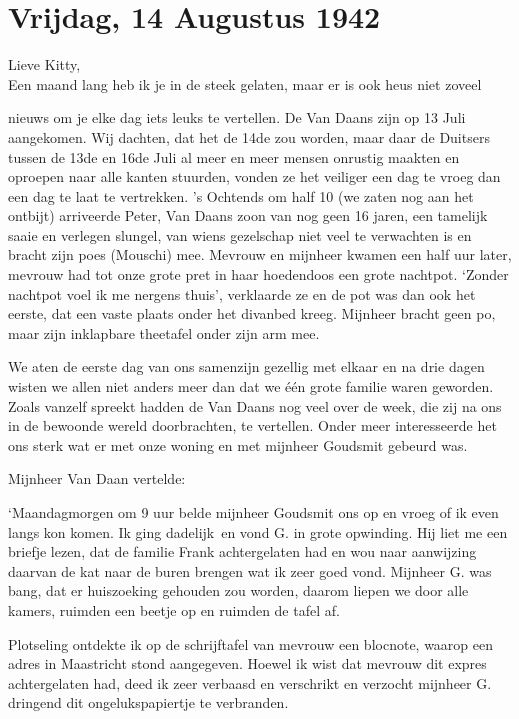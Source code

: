 \documentclass{book}
\begin{document}
\chapter{Vrijdag, 14 Augustus 1942}

Lieve Kitty,\\Een maand lang heb ik je in de steek gelaten, maar er is
ook heus niet zoveel

nieuws om je elke dag iets leuks te vertellen. De Van Daans zijn op 13
Juli aangekomen. Wij dachten, dat het de 14de zou worden, maar daar de
Duitsers tussen de 13de en 16de Juli al meer en meer mensen onrustig
maakten en oproepen naar alle kanten stuurden, vonden ze het veiliger
een dag te vroeg dan een dag te laat te vertrekken. 's Ochtends om half
10 (we zaten nog aan het ontbijt) arriveerde Peter, Van Daans zoon van
nog geen 16 jaren, een tamelijk saaie en verlegen slungel, van wiens
gezelschap niet veel te verwachten is en bracht zijn poes (Mouschi) mee.
Mevrouw en mijnheer kwamen een half uur later, mevrouw had tot onze
grote pret in haar hoedendoos een grote nachtpot. `Zonder nachtpot voel
ik me nergens thuis', verklaarde ze en de pot was dan ook het eerste,
dat een vaste plaats onder het divanbed kreeg. Mijnheer bracht geen po,
maar zijn inklapbare theetafel onder zijn arm mee.

We aten de eerste dag van ons samenzijn gezellig met elkaar en na drie
dagen wisten we allen niet anders meer dan dat we één grote familie
waren geworden. Zoals vanzelf spreekt hadden de Van Daans nog veel over
de week, die zij na ons in de bewoonde wereld doorbrachten, te
vertellen. Onder meer interesseerde het ons sterk wat er met onze woning
en met mijnheer Goudsmit gebeurd was.

Mijnheer Van Daan vertelde:

`Maandagmorgen om 9 uur belde mijnheer Goudsmit ons op en vroeg of ik
even langs kon komen. Ik ging dadelijk~en vond G. in grote opwinding.
Hij liet me een briefje lezen, dat de familie Frank achtergelaten had en
wou naar aanwijzing daarvan de kat naar de buren brengen wat ik zeer
goed vond. Mijnheer G. was bang, dat er huiszoeking gehouden zou worden,
daarom liepen we door alle kamers, ruimden een beetje op en ruimden de
tafel af.

Plotseling ontdekte ik op de schrijftafel van mevrouw een blocnote,
waarop een adres in Maastricht stond aangegeven. Hoewel ik wist dat
mevrouw dit expres achtergelaten had, deed ik zeer verbaasd en
verschrikt en verzocht mijnheer G. dringend dit ongelukspapiertje te
verbranden.
\end{document}
